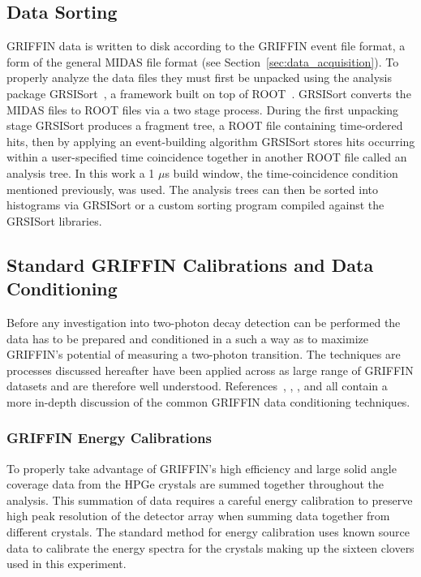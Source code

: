 \documentclass[cnatzke_thesis_proposal.tex]{subfiles}
\begin{document}
\subsection{Data Sorting}
GRIFFIN data is written to disk according to the GRIFFIN event file format, a form of the general MIDAS file format (see Section~\ref{sec:data_acquisition}).
To properly analyze the data files they must first be unpacked using the analysis package GRSISort~\cite{bildstein_griffincollaborationgrsisort_2019}, a framework built on top of ROOT~\cite{brun_root-projectroot_2019}.
GRSISort converts the MIDAS files to ROOT files via a two stage process.
During the first unpacking stage GRSISort produces a fragment tree, a ROOT file containing time-ordered hits, then by applying an event-building algorithm GRSISort stores hits occurring within a user-specified time coincidence together in another ROOT file called an analysis tree.
In this work a 1 $\mu$s build window, the time-coincidence condition mentioned previously, was used.
The analysis trees can then be sorted into histograms via GRSISort or a custom sorting program compiled against the GRSISort libraries.

\subsection{Standard GRIFFIN Calibrations and Data Conditioning}
Before any investigation into two-photon decay detection can be performed the data has to be prepared and conditioned in a such a way as to maximize GRIFFIN's potential of measuring a two-photon transition. 
The techniques are processes discussed hereafter have been applied across as large range of GRIFFIN datasets and are therefore well understood. 
References~\cite{smith_gamma-gamma_2019}, \cite{garcia_absence_2020}, \cite{maclean_spectroscopy_2021}, and \cite{porzio_configuration_2021} all contain a more in-depth discussion of the common GRIFFIN data conditioning techniques.

\subsubsection{GRIFFIN Energy Calibrations}
To properly take advantage of GRIFFIN's high efficiency and large solid angle coverage data from the HPGe crystals are summed together throughout the analysis.
This summation of data requires a careful energy calibration to preserve high peak resolution of the detector array when summing data together from different crystals. 
The standard method for energy calibration uses known source data to calibrate the energy spectra for the crystals making up the sixteen clovers used in this experiment. 
\end{document}
